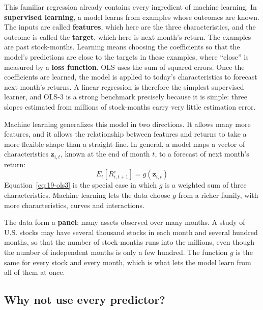 This familiar regression already contains every ingredient of machine learning. In \textbf{supervised learning}, a model learns from examples whose outcomes are known. The inputs are called \textbf{features}, which here are the three characteristics, and the outcome is called the \textbf{target}, which here is next month's return. The examples are past stock-months. Learning means choosing the coefficients so that the model's predictions are close to the targets in these examples, where ``close'' is measured by a \textbf{loss function}. OLS uses the sum of squared errors. Once the coefficients are learned, the model is applied to today's characteristics to forecast next month's returns. A linear regression is therefore the simplest supervised learner, and OLS-3 is a strong benchmark precisely because it is simple: three slopes estimated from millions of stock-months carry very little estimation error.

Machine learning generalizes this model in two directions. It allows many more features, and it allows the relationship between features and returns to take a more flexible shape than a straight line. In general, a model maps a vector of characteristics $\mathbf{z}_{i,t}$, known at the end of month $t$, to a forecast of next month's return:
\begin{equation}
  E_t[R^{e}_{i,t+1}] = g(\mathbf{z}_{i,t})
  \label{eq:19-g}
\end{equation}
Equation~\eqref{eq:19-ols3} is the special case in which $g$ is a weighted sum of three characteristics. Machine learning lets the data choose $g$ from a richer family, with more characteristics, curves and interactions.

The data form a \textbf{panel}: many assets observed over many months. A study of U.S. stocks may have several thousand stocks in each month and several hundred months, so that the number of stock-months runs into the millions, even though the number of independent months is only a few hundred. The function $g$ is the same for every stock and every month, which is what lets the model learn from all of them at once.

\subsection{Why not use every predictor?}
\label{sec:19-why}

